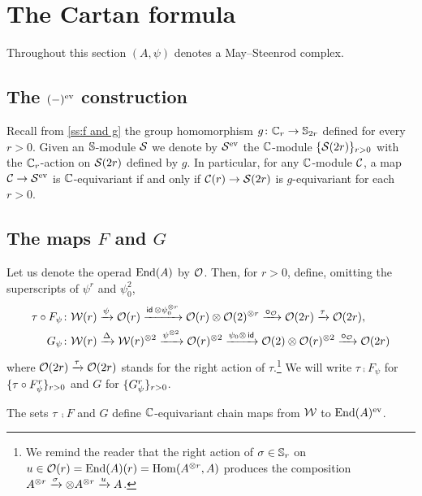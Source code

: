 
\section{The Cartan formula}\label{s:cartan}

\noindent Throughout this section $(A,\psi)$ denotes a May--Steenrod complex.

\subsection{The $(-)^{\mathrm{ev}}$ construction}

Recall from \cref{ss:f and g} the group homomorphism $g \colon \mathbb{C}_r \to \mathbb{S}_{2r}$ defined for every $r > 0$.
Given an $\mathbb{S}$-module $\mathcal{S}$ we denote by $\mathcal{S}^{\mathrm{ev}}$ the $\mathbb{C}$-module $\{\mathcal{S}(2r)\}_{r>0}$ with the $\mathbb{C}_r$-action on $\mathcal{S}(2r)$ defined by $g$.
In particular, for any $\mathbb{C}$-module $\mathcal{C}$, a map $\mathcal{C} \to \mathcal{S}^{\mathrm{ev}}$ is $\mathbb{C}$-equivariant if and only if $\mathcal{C}(r) \to \mathcal{S}(2r)$ is $g$-equivariant for each $r > 0$.

\subsection{The maps $F$ and $G$}

Let us denote the operad $\mathrm{End}(A)$ by $\mathcal{O}$.
Then, for $r > 0$, define, omitting the superscripts of $\psi^r$ and $\psi_0^2$,
\begin{align*}
	\tau \mathbin{\circ} F_\psi \colon& \mathcal{W}(r) \xrightarrow{\psi} \mathcal{O}(r) \xrightarrow{\mathsf{id}\, \otimes \psi_0^{\otimes r}}
	\mathcal{O}(r) \otimes \mathcal{O}(2)^{\otimes r} \xrightarrow{\bm{\mathbin{\circ}}_{\mathcal{O}}}
	\mathcal{O}(2r) \xrightarrow{\tau} \mathcal{O}(2r), \\
	G_\psi \colon& \mathcal{W}(r) \xrightarrow{\Delta}
	\mathcal{W}(r)^{\otimes 2} \xrightarrow{\psi^{\otimes 2}}
	\mathcal{O}(r)^{\otimes 2} \xrightarrow{\psi_0 \otimes\, \mathsf{id}}
	\mathcal{O}(2) \otimes \mathcal{O}(r)^{\otimes 2} \xrightarrow{\bm{\mathbin{\circ}}_{\mathcal{O}}}
	\mathcal{O}(2r)
\end{align*}
where $\mathcal{O}(2r) \xrightarrow{\tau} \mathcal{O}(2r)$ stands for the right action of $\tau$.\footnote{\label{fn:symmetric_action_on_hom}
We remind the reader that the right action of $\sigma \in \mathbb{S}_r$ on $u \in \mathcal{O}(r) = \mathrm{End}(A)(r) = \mathrm{Hom}(A^{\otimes r}, A)$ produces the composition $A^{\otimes r} \xrightarrow{\sigma} \otimes A^{\otimes r} \xrightarrow{u} A$.}
We will write $\tau \comp F_\psi$ for $\{\tau \mathbin{\circ} F_\psi^r\}_{r>0}$ and $G$ for $\{G_\psi^r\}_{r>0}$.

\begin{lemma*}
	The sets $\tau\, \comp F$ and $G$ define $\mathbb{C}$-equivariant chain maps from $\mathcal{W}$ to $\mathrm{End}(A)^{\mathrm{ev}}$.
\end{lemma*}

